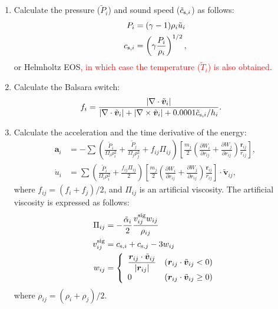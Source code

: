 \documentclass[fleqn,dvipdfmx]{article}
\newcommand{\redtext}[1]{\textcolor{red}{#1}}
\begin{document}
\begin{enumerate}
\item Calculate the pressure ($\tilde{P}_i$) and sound speed
  ($\tilde{c}_{{\rm s},i}$) as follows:
  \begin{align}
    P_i &= (\gamma - 1) \rho_i \tilde{u}_i \\
    c_{{\rm s},i} &= \left( \gamma \frac{P_i}{\rho_i} \right)^{1/2},
  \end{align}
  or Helmholtz EOS\redtext{, in which case the temperature
    ($\tilde{T}_i$) is also obtained}.

\item Calculate the Balsara switch:
  \begin{align}
    f_i &= \frac{|\nabla \cdot \tilde{\bm{v}}_i|}{|\nabla \cdot
      \tilde{\bm{v}}_i| + |\nabla \times \tilde{\bm{v}}_i| + 0.0001
      \tilde{c}_{{\rm s},i} / h_i}.
  \end{align}

\item Calculate the acceleration and the time derivative of the
  energy:
  \begin{align}
    \bm{a}_i &= - \sum \left( \frac{\tilde{P}_i}{\Omega_i \rho_i^2} +
    \frac{\tilde{P}_j}{\Omega_j \rho_j^2} + f_{ij} \Pi_{ij} \right)
    \left[ \frac{m_j}{2} \left( \frac{\partial W_i}{\partial r_{ij}} +
      \frac{\partial W_j}{\partial r_{ij}} \right)
      \frac{\bm{r}_{ij}}{r_{ij}} \right], \\ \dot{u}_i &= \sum \left(
    \frac{\tilde{P}_i}{\Omega_i \rho_i^2} + \frac{f_{ij} \Pi_{ij}}{2}
    \right) \left[ \frac{m_j}{2} \left( \frac{\partial W_i}{\partial
        r_{ij}} + \frac{\partial W_j}{\partial r_{ij}} \right)
      \frac{\bm{r}_{ij}}{r_{ij}} \right] \cdot \tilde{\bm{v}}_{ij},
  \end{align}
  where $f_{ij}=(f_i+f_j)/2$, and $\Pi_{ij}$ is an artificial
  viscosity. The artificial viscosity is expressed as follows:
  \begin{align}
    \Pi_{ij} &= - \frac{\tilde{\alpha}_i}{2} \frac{v_{ij}^{\rm sig}
      w_{ij}}{\rho_{ij}} \\
    v_{ij}^{\rm sig} &= c_{{\rm s},i} + c_{{\rm s},j} - 3 w_{ij} \\
    w_{ij} &= \left\{
    \begin{array}{ll}
      \displaystyle \frac{\bm{r}_{ij} \cdot
        \tilde{\bm{v}}_{ij}}{|\bm{r}_{ij}|} & (\bm{r}_{ij} \cdot
     \tilde{\bm{v}}_{ij} < 0) \\ 0 & (\bm{r}_{ij} \cdot
      \tilde{\bm{v}}_{ij} \ge 0)
    \end{array}
    \right.    
  \end{align}
  where $\rho_{ij}=(\rho_i+\rho_j)/2$.


\end{enumerate}
\end{document}
